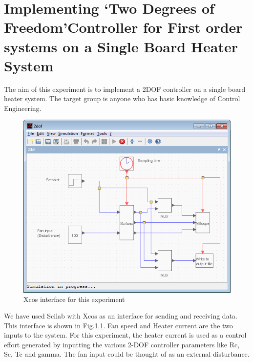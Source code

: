 \chapter{Implementing \textquoteleft Two Degrees of Freedom\textquoteright Controller for First order systems on a
Single Board Heater System}
The aim of this experiment is to implement a 2DOF controller on a
single board heater system.  The target group is anyone who has basic
knowledge of Control Engineering.
\begin{figure}
\centering
\includegraphics[width=0.9\linewidth]{2-DOF_manual/2dof_xcos.png}
\caption{Xcos interface for this experiment}
\label{Xcos_2dof}
\end{figure}
We have used Scilab with Xcos as an interface for sending and receiving data. This interface is shown in Fig.\ref{Xcos_2dof}. Fan speed and Heater current are the two inputs to the system. For this experiment, the heater current is used as a control effort generated by inputting the various 2-DOF controller parameters like Rc, Sc, Tc and gamma. The fan input could be thought of as an external disturbance.
